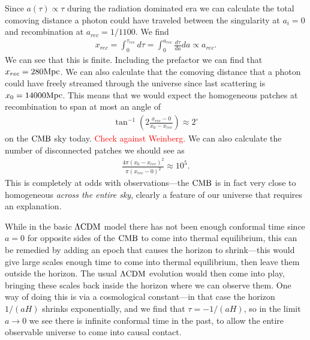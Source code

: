     Since $a(\tau)\propto \tau$ during the radiation dominated era we can calculate
    the total comoving distance a photon could have traveled between the singularity at $a_i=0$
    and recombination at $a_{rec}=1/1100$. We find
    \begin{align}
        x_{rec} = \int_{0}^{\tau_{rec}} d \tau = \int_{0}^{a_{rec}} \frac{d\tau}{da}da \propto a_{rec}.
    \end{align}
    We can see that this is finite.
    Including the prefactor we can find that $x_{rec}=280\text{Mpc}$.
    We can also calculate that the comoving distance that a photon could have
    freely streamed through the universe since
    last scattering is $x_0=14000\text{Mpc}$.
    This means that we would expect the homogeneous patches at recombination to span
    at most an angle of
    \begin{align}
        \tan^{-1}\left(2\frac{x_{rec}-0}{x_{0}-x_{rec}}\right) \approx 2^{\circ}
    \end{align}
    on the $\text{CMB}$ sky today.
    \textcolor{red}{Check against Weinberg.}
    We can also calculate the number of disconnected patches
    we should see as
    \begin{align}
        \frac{4\pi(x_{0}-x_{rec})^2}{\pi(x_{rec}-0)^2} \approx 10^5.
    \end{align}
    This is completely at odds with observations---the $\text{CMB}$ is in fact very close to
    homogeneous \textit{across the entire sky}, clearly a feature of our universe
    that requires an explanation.


    While in the basic $\Lambda\text{CDM}$ model there has not been enough conformal time since $a=0$ for
    opposite sides of the $\text{CMB}$ to come into thermal equilibrium, this can be remedied by
    adding an epoch that causes the horizon to shrink---this would give large scales enough time
    to come into thermal equilibrium, then leave them outside the horizon. The usual $\Lambda\text{CDM}$ evolution
    would then come into play, bringing these scales back inside the horizon where we can observe them.
    One way of doing this is via a cosmological constant---in that case the horizon $1/(aH)$ shrinks
    exponentially, and we find that $\tau=-1/(aH)$, so in the limit $a\rightarrow 0$ we see there is
    infinite conformal time in the past, to allow the entire observable universe to come into
    causal contact.


